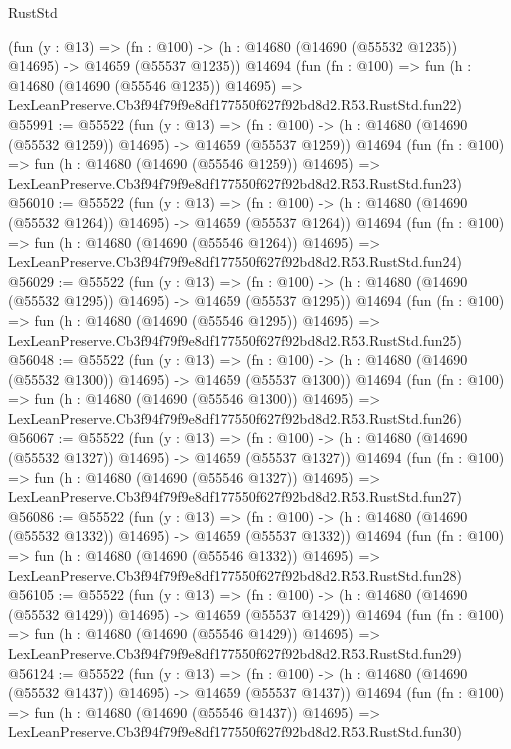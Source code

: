 \begin{lexlean}{RustStd}
\begin{coremodule}
    (fun (y : @13) =>
    (fn : @100) -> (h : @14680 (@14690 (@55532 @1235)) @14695) -> @14659 (@55537 @1235))
    @14694
    (fun (fn : @100) =>
    fun (h : @14680 (@14690 (@55546 @1235)) @14695) =>
    LexLeanPreserve.Cb3f94f79f9e8df177550f627f92bd8d2.R53.RustStd.fun22)
@55991 := @55522
    (fun (y : @13) =>
    (fn : @100) -> (h : @14680 (@14690 (@55532 @1259)) @14695) -> @14659 (@55537 @1259))
    @14694
    (fun (fn : @100) =>
    fun (h : @14680 (@14690 (@55546 @1259)) @14695) =>
    LexLeanPreserve.Cb3f94f79f9e8df177550f627f92bd8d2.R53.RustStd.fun23)
@56010 := @55522
    (fun (y : @13) =>
    (fn : @100) -> (h : @14680 (@14690 (@55532 @1264)) @14695) -> @14659 (@55537 @1264))
    @14694
    (fun (fn : @100) =>
    fun (h : @14680 (@14690 (@55546 @1264)) @14695) =>
    LexLeanPreserve.Cb3f94f79f9e8df177550f627f92bd8d2.R53.RustStd.fun24)
@56029 := @55522
    (fun (y : @13) =>
    (fn : @100) -> (h : @14680 (@14690 (@55532 @1295)) @14695) -> @14659 (@55537 @1295))
    @14694
    (fun (fn : @100) =>
    fun (h : @14680 (@14690 (@55546 @1295)) @14695) =>
    LexLeanPreserve.Cb3f94f79f9e8df177550f627f92bd8d2.R53.RustStd.fun25)
@56048 := @55522
    (fun (y : @13) =>
    (fn : @100) -> (h : @14680 (@14690 (@55532 @1300)) @14695) -> @14659 (@55537 @1300))
    @14694
    (fun (fn : @100) =>
    fun (h : @14680 (@14690 (@55546 @1300)) @14695) =>
    LexLeanPreserve.Cb3f94f79f9e8df177550f627f92bd8d2.R53.RustStd.fun26)
@56067 := @55522
    (fun (y : @13) =>
    (fn : @100) -> (h : @14680 (@14690 (@55532 @1327)) @14695) -> @14659 (@55537 @1327))
    @14694
    (fun (fn : @100) =>
    fun (h : @14680 (@14690 (@55546 @1327)) @14695) =>
    LexLeanPreserve.Cb3f94f79f9e8df177550f627f92bd8d2.R53.RustStd.fun27)
@56086 := @55522
    (fun (y : @13) =>
    (fn : @100) -> (h : @14680 (@14690 (@55532 @1332)) @14695) -> @14659 (@55537 @1332))
    @14694
    (fun (fn : @100) =>
    fun (h : @14680 (@14690 (@55546 @1332)) @14695) =>
    LexLeanPreserve.Cb3f94f79f9e8df177550f627f92bd8d2.R53.RustStd.fun28)
@56105 := @55522
    (fun (y : @13) =>
    (fn : @100) -> (h : @14680 (@14690 (@55532 @1429)) @14695) -> @14659 (@55537 @1429))
    @14694
    (fun (fn : @100) =>
    fun (h : @14680 (@14690 (@55546 @1429)) @14695) =>
    LexLeanPreserve.Cb3f94f79f9e8df177550f627f92bd8d2.R53.RustStd.fun29)
@56124 := @55522
    (fun (y : @13) =>
    (fn : @100) -> (h : @14680 (@14690 (@55532 @1437)) @14695) -> @14659 (@55537 @1437))
    @14694
    (fun (fn : @100) =>
    fun (h : @14680 (@14690 (@55546 @1437)) @14695) =>
    LexLeanPreserve.Cb3f94f79f9e8df177550f627f92bd8d2.R53.RustStd.fun30)

\end{coremodule}
\end{lexlean}
